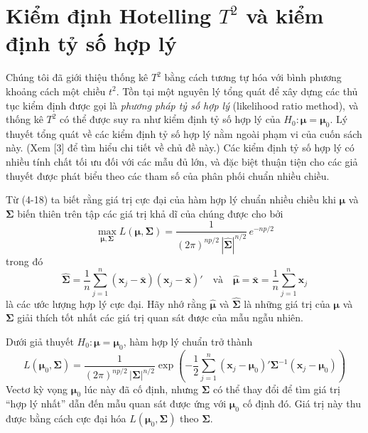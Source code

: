 
\section{Kiểm định Hotelling \texorpdfstring{\(T^2\)}{T2} và kiểm định tỷ số hợp lý}
\label{sec:ch05-03}


Chúng tôi đã giới thiệu thống kê $T^2$ bằng cách tương tự hóa với bình phương khoảng cách một chiều $t^2$. Tồn tại một nguyên lý tổng quát để xây dựng các thủ tục kiểm định được gọi là \emph{phương pháp tỷ số hợp lý} (likelihood ratio method), và thống kê $T^2$ có thể được suy ra như kiểm định tỷ số hợp lý của $H_0: \boldsymbol{\mu} = \boldsymbol{\mu}_0$. Lý thuyết tổng quát về các kiểm định tỷ số hợp lý nằm ngoài phạm vi của cuốn sách này. (Xem [3] để tìm hiểu chi tiết về chủ đề này.) Các kiểm định tỷ số hợp lý có nhiều tính chất tối ưu đối với các mẫu đủ lớn, và đặc biệt thuận tiện cho các giả thuyết được phát biểu theo các tham số của phân phối chuẩn nhiều chiều.

Từ (4-18) ta biết rằng giá trị cực đại của hàm hợp lý chuẩn nhiều chiều khi $\boldsymbol{\mu}$ và $\boldsymbol{\Sigma}$ biến thiên trên tập các giá trị khả dĩ của chúng được cho bởi
\begin{equation}
\max_{\boldsymbol{\mu},\boldsymbol{\Sigma}} L(\boldsymbol{\mu},\boldsymbol{\Sigma}) = \frac{1}{(2\pi)^{np/2}\,|\hat{\boldsymbol{\Sigma}}|^{n/2}}\, e^{-np/2}
\tag{5-10}
\end{equation}
trong đó
\[
\hat{\boldsymbol{\Sigma}} = \frac{1}{n}\sum_{j=1}^{n}(\mathbf{x}_j-\bar{\mathbf{x}})(\mathbf{x}_j-\bar{\mathbf{x}})'
\quad\text{và}\quad
\hat{\boldsymbol{\mu}} = \bar{\mathbf{x}} = \frac{1}{n}\sum_{j=1}^{n}\mathbf{x}_j
\]
là các ước lượng hợp lý cực đại. Hãy nhớ rằng $\hat{\boldsymbol{\mu}}$ và $\hat{\boldsymbol{\Sigma}}$ là những giá trị của $\boldsymbol{\mu}$ và $\boldsymbol{\Sigma}$ giải thích tốt nhất các giá trị quan sát được của mẫu ngẫu nhiên.

Dưới giả thuyết $H_0: \boldsymbol{\mu} = \boldsymbol{\mu}_0$, hàm hợp lý chuẩn trở thành
\[
L(\boldsymbol{\mu}_0,\boldsymbol{\Sigma}) = \frac{1}{(2\pi)^{np/2}\,|\boldsymbol{\Sigma}|^{n/2}}
\exp\!\left(-\frac{1}{2}\sum_{j=1}^{n}(\mathbf{x}_j-\boldsymbol{\mu}_0)'\boldsymbol{\Sigma}^{-1}(\mathbf{x}_j-\boldsymbol{\mu}_0)\right)
\]
Vectơ kỳ vọng $\boldsymbol{\mu}_0$ lúc này đã cố định, nhưng $\boldsymbol{\Sigma}$ có thể thay đổi để tìm giá trị ``hợp lý nhất'' dẫn đến mẫu quan sát được ứng với $\boldsymbol{\mu}_0$ cố định đó. Giá trị này thu được bằng cách cực đại hóa $L(\boldsymbol{\mu}_0,\boldsymbol{\Sigma})$ theo $\boldsymbol{\Sigma}$.

